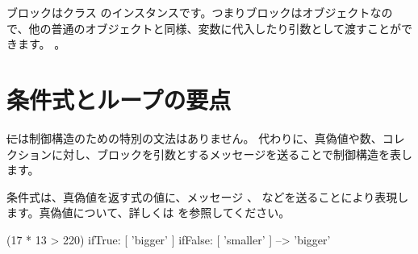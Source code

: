 \documentclass[a4paper,10pt,twoside]{book}
\begin{document}
ブロックはクラス  のインスタンスです。つまりブロックはオブジェクトなので、他の普通のオブジェクトと同様、変数に代入したり引数として渡すことができます。
。






\section{条件式とループの要点}

\st には制御構造のための特別の文法はありません。
代わりに、真偽値や数、コレクションに対し、ブロックを引数とするメッセージを送ることで制御構造を表します。

条件式は、真偽値を返す式の値に、メッセージ 、  などを送ることにより表現します。真偽値について、詳しくは を参照してください。

\begin{code}{}
(17 * 13 > 220)
   ifTrue: [ 'bigger' ]
   ifFalse: [ 'smaller' ] --> 'bigger'
\end{code}
\end{document}
